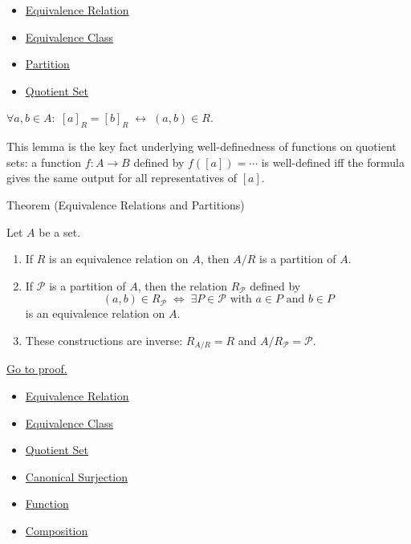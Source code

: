 \begin{dependencies}
\begin{itemize}
  \item \hyperref[def:equivalence-relation]{Equivalence Relation}
  \item \hyperref[def:equiv-class]{Equivalence Class}
  \item \hyperref[def:partition]{Partition}
  \item \hyperref[def:quotient-set]{Quotient Set}
\end{itemize}
\end{dependencies}

\begin{remark*}
$\forall a, b \in A:\; [a]_R = [b]_R \;\leftrightarrow\; (a,b)\in R$.
\end{remark*}
\begin{remark*}
This lemma is the key fact underlying well-definedness of functions on quotient
sets: a function $f : A \to B$ defined by $f([a]) = \cdots$ is well-defined
iff the formula gives the same output for all representatives of $[a]$.
\end{remark*}

\begin{theorembox}{Theorem (Equivalence Relations and Partitions)}
\begin{theorem}\label{thm:equiv-partition}
Let $A$ be a set.
\begin{enumerate}[label=(\roman*)]
\item If $R$ is an equivalence relation on $A$, then $A/R$ is a partition of $A$.
\item If $\mathcal{P}$ is a partition of $A$, then the relation
$R_{\mathcal{P}}$ defined by
\[
(a,b) \in R_{\mathcal{P}} \;\Longleftrightarrow\;
\exists P \in \mathcal{P} \text{ with } a \in P \text{ and } b \in P
\]
is an equivalence relation on $A$.
\item These constructions are inverse: $R_{A/R} = R$ and $A/R_{\mathcal{P}} = \mathcal{P}$.
\end{enumerate}
\hyperref[prf:equiv-partition]{Go to proof.}
\end{theorem}
\end{theorembox}

\begin{dependencies}
\begin{itemize}
  \item \hyperref[def:equivalence-relation]{Equivalence Relation}
  \item \hyperref[def:equiv-class]{Equivalence Class}
  \item \hyperref[def:quotient-set]{Quotient Set}
  \item \hyperref[def:canonical-surj]{Canonical Surjection}
  \item \hyperref[def:function]{Function}
  \item \hyperref[def:composition]{Composition}
\end{itemize}
\end{dependencies}

